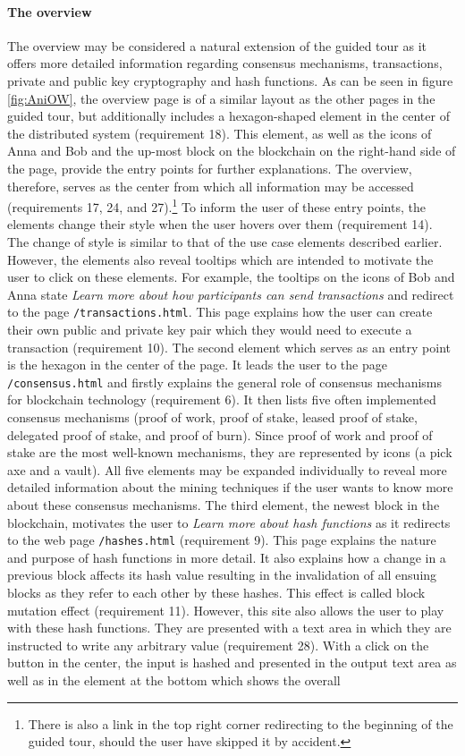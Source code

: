 \paragraph{The overview}
The overview may be considered a natural extension of the guided tour as it offers more detailed information regarding consensus mechanisms, transactions, private and public key cryptography and hash functions. As can be seen in figure \ref{fig:AniOW}, the overview page is of a similar layout as the other pages in the guided tour, but additionally includes a hexagon-shaped element in the center of the distributed system (requirement 18). This element, as well as the icons of Anna and Bob and the up-most block on the blockchain on the right-hand side of the page, provide the entry points for further explanations. The overview, therefore, serves as the center from which all information may be accessed (requirements 17, 24, and 27).\footnote{There is also a link in the top right corner redirecting to the beginning of the guided tour, should the user have skipped it by accident.} To inform the user of these entry points, the elements change their style when the user hovers over them (requirement 14). The change of style is similar to that of the use case elements described earlier. However, the elements also reveal tooltips which are intended to motivate the user to click on these elements. For example, the tooltips on the icons of Bob and Anna state \textit{Learn more about how participants can send transactions} and redirect to the page \texttt{/transactions.html}. This page explains how the user can create their own public and private key pair which they would need to execute a transaction (requirement 10). The second element which serves as an entry point is the hexagon in the center of the page. It leads the user to the page \texttt{/consensus.html} and firstly explains the general role of consensus mechanisms for blockchain technology (requirement 6). It then lists five often implemented consensus mechanisms (proof of work, proof of stake, leased proof of stake, delegated proof of stake, and proof of burn). Since proof of work and proof of stake are the most well-known mechanisms, they are represented by icons (a pick axe and a vault). All five elements may be expanded individually to reveal more detailed information about the mining techniques if the user wants to know more about these consensus mechanisms. The third element, the newest block in the blockchain, motivates the user to \textit{Learn more about hash functions} as it redirects to the web page \texttt{/hashes.html} (requirement 9). This page explains the nature and purpose of hash functions in more detail. It also explains how a change in a previous block affects its hash value resulting in the invalidation of all ensuing blocks as they refer to each other by these hashes. This effect is called block mutation effect (requirement 11). However, this site also allows the user to play with these hash functions. They are presented with a text area in which they are instructed to write any arbitrary value (requirement 28). With a click on the button in the center, the input is hashed and presented in the output text area as well as in the element at the bottom which shows the overall 